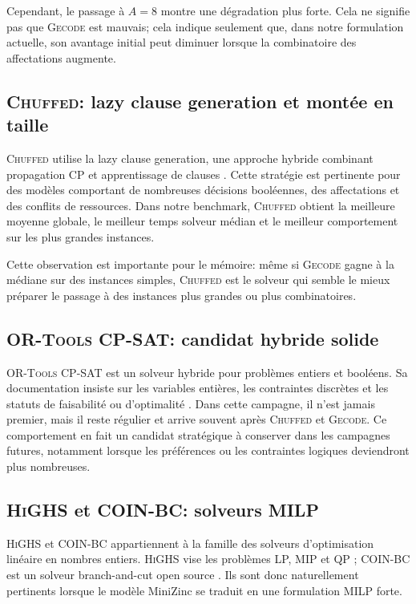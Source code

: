 \documentclass[12pt,a4paper]{article}
\newcommand{\solver}[1]{\textnormal{\textsc{#1}}}
\newcommand{\mzn}{MiniZinc}
\begin{document}
Cependant, le passage à $A=8$ montre une dégradation plus forte. Cela ne signifie pas que \solver{Gecode} est mauvais; cela indique seulement que, dans notre formulation actuelle, son avantage initial peut diminuer lorsque la combinatoire des affectations augmente.

\subsection{\solver{Chuffed}: lazy clause generation et montée en taille}

\solver{Chuffed} utilise la lazy clause generation, une approche hybride combinant propagation CP et apprentissage de clauses \cite{feydy-stuckey-lcg}. Cette stratégie est pertinente pour des modèles comportant de nombreuses décisions booléennes, des affectations et des conflits de ressources. Dans notre benchmark, \solver{Chuffed} obtient la meilleure moyenne globale, le meilleur temps solveur médian et le meilleur comportement sur les plus grandes instances.

Cette observation est importante pour le mémoire: même si \solver{Gecode} gagne à la médiane sur des instances simples, \solver{Chuffed} est le solveur qui semble le mieux préparer le passage à des instances plus grandes ou plus combinatoires.

\subsection{\solver{OR-Tools CP-SAT}: candidat hybride solide}

\solver{OR-Tools CP-SAT} est un solveur hybride pour problèmes entiers et booléens. Sa documentation insiste sur les variables entières, les contraintes discrètes et les statuts de faisabilité ou d'optimalité \cite{ortools-cpsat}. Dans cette campagne, il n'est jamais premier, mais il reste régulier et arrive souvent après \solver{Chuffed} et \solver{Gecode}. Ce comportement en fait un candidat stratégique à conserver dans les campagnes futures, notamment lorsque les préférences ou les contraintes logiques deviendront plus nombreuses.

\subsection{\solver{HiGHS} et \solver{COIN-BC}: solveurs MILP}

\solver{HiGHS} et \solver{COIN-BC} appartiennent à la famille des solveurs d'optimisation linéaire en nombres entiers. \solver{HiGHS} vise les problèmes LP, MIP et QP \cite{highs-site,huangfu-hall}; \solver{COIN-BC} est un solveur branch-and-cut open source \cite{cbc-intro}. Ils sont donc naturellement pertinents lorsque le modèle \mzn{} se traduit en une formulation MILP forte.
\end{document}
